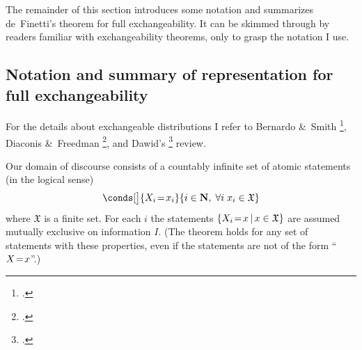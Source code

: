 \documentclass[\ifafour a4paper,12pt,\else a5paper,10pt,\fi%
onecolumn,oneside,article,%
british%
]{memoir}
\theoremstyle{remark}
\theoremstyle{innote}
\newcommand*{\citep}{\footcites}
\newcommand*{\amp}{\&}
\newcommand*{\NN}{\bm{\mathrm{N}}}
\DeclarePairedDelimiter\set{\{}{\}}
\renewcommand*{\|}[1][]{\nonscript\,#1\vert\nonscript\,\mathopen{}}
\newcommand*{\sects}{\S\S}%
\renewcommand*{\=}{\TextOrMath\texteq\eq}
\newcommand*{\X}[1]{X_{#1}}
\newcommand*{\x}[1]{x_{#1}}
\newcommand*{\sx}{\mathfrak{X}}
\begin{document}



The remainder of this section introduces some notation and summarizes
de~Finetti's theorem for full exchangeability. It can be skimmed through by
readers familiar with exchangeability theorems, only to grasp the notation
I use.

\subsection{Notation and summary of representation for full exchangeability}
\label{sec:setup}


For the details about exchangeable distributions I refer to Bernardo \amp\
Smith \citep[\sects~4.3, 4.6]{bernardoetal1994_r2000}, Diaconis \amp\
Freedman \citep{diaconisetal1980,diaconisetal1980b}, and Dawid's
\citep{dawid2013} review. 

Our domain of discourse consists of a countably infinite set of atomic
statements (in the logical sense)
 \begin{equation}
  \label{eq:statements}
  \conds[\big]{\X{i}\=\x{i}}{i \in \NN,\;
 \forall i\;\x{i} \in \sx}
\end{equation}
where $\sx$ is a finite set. For each $i$ the statements
$\set{\X{i}\=x \| x \in \sx}$ are assumed mutually exclusive on information
$I$. (The theorem holds for any set of statements with these properties,
even if the statements are not of the form \enquote{$X\=x$}.)
\end{document}
